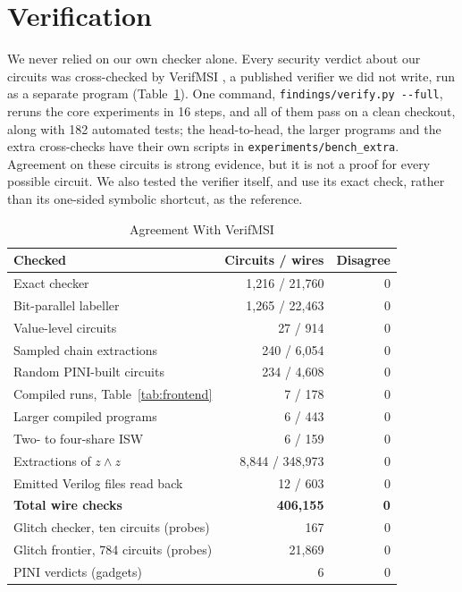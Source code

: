 \documentclass[conference]{IEEEtran}
\newcommand{\code}[1]{\texttt{\small #1}}
\begin{document}
\section{Verification}\label{sec:evidence}
We never relied on our own checker alone. Every security verdict about our circuits was cross-checked by VerifMSI \cite{meunier2023verifmsi}, a published verifier we did not write, run as a separate program (Table~\ref{tab:oracle}). One command, \code{findings/verify.py -{}-full}, reruns the core experiments in 16 steps, and all of them pass on a clean checkout, along with 182 automated tests; the head-to-head, the larger programs and the extra cross-checks have their own scripts in \texttt{experiments/bench\_extra}. Agreement on these circuits is strong evidence, but it is not a proof for every possible circuit. We also tested the verifier itself, and use its exact check, rather than its one-sided symbolic shortcut, as the reference.

\begin{table}[t]
\caption{Agreement With VerifMSI}\label{tab:oracle}
\centering\footnotesize
\begin{tabular}{@{}lrr@{}}
\toprule
Checked & Circuits / wires & Disagree\\\midrule
Exact checker & 1,216 / 21,760 & 0\\
Bit-parallel labeller & 1,265 / 22,463 & 0\\
Value-level circuits & 27 / 914 & 0\\
Sampled chain extractions & 240 / 6,054 & 0\\
Random PINI-built circuits & 234 / 4,608 & 0\\
Compiled runs, Table~\ref{tab:frontend} & 7 / 178 & 0\\
Larger compiled programs & 6 / 443 & 0\\
Two- to four-share ISW & 6 / 159 & 0\\\midrule
Extractions of $z\wedge z$ & 8,844 / 348,973 & 0\\
Emitted Verilog files read back & 12 / 603 & 0\\\midrule
\textbf{Total wire checks} & \textbf{406,155} & \textbf{0}\\\midrule
Glitch checker, ten circuits (probes) & 167 & 0\\
Glitch frontier, 784 circuits (probes) & 21,869 & 0\\
PINI verdicts (gadgets) & 6 & 0\\
\bottomrule
\end{tabular}
\end{table}
\end{document}
